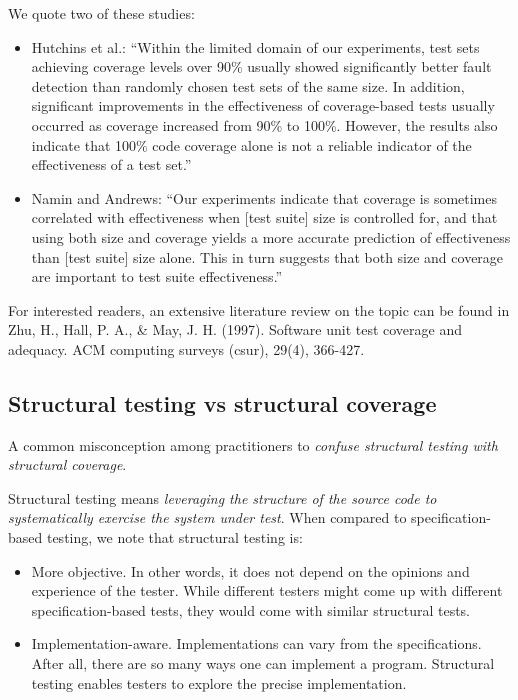We quote two of these studies:

\begin{itemize}
\tightlist
\item
  Hutchins et al.: ``Within the limited domain of our experiments, test
  sets achieving coverage levels over 90\% usually showed significantly
  better fault detection than randomly chosen test sets of the same
  size. In addition, significant improvements in the effectiveness of
  coverage-based tests usually occurred as coverage increased from 90\%
  to 100\%. However, the results also indicate that 100\% code coverage
  alone is not a reliable indicator of the effectiveness of a test
  set.''
\item
  Namin and Andrews: ``Our experiments indicate that coverage is
  sometimes correlated with effectiveness when {[}test suite{]} size is
  controlled for, and that using both size and coverage yields a more
  accurate prediction of effectiveness than {[}test suite{]} size alone.
  This in turn suggests that both size and coverage are important to
  test suite effectiveness.''
\end{itemize}

For interested readers, an extensive literature review on the topic can
be found in Zhu, H., Hall, P. A., \& May, J. H. (1997). Software unit
test coverage and adequacy. ACM computing surveys (csur), 29(4),
366-427.

\hypertarget{structural-testing-vs-structural-coverage}{%
\subsection{Structural testing vs structural
coverage}\label{structural-testing-vs-structural-coverage}}

A common misconception among practitioners to \emph{confuse structural
testing with structural coverage}.

Structural testing means \emph{leveraging the structure of the source
code to systematically exercise the system under test}. When compared to
specification-based testing, we note that structural testing is:

\begin{itemize}
\item
  More objective. In other words, it does not depend on the opinions and
  experience of the tester. While different testers might come up with
  different specification-based tests, they would come with similar
  structural tests.
\item
  Implementation-aware. Implementations can vary from the
  specifications. After all, there are so many ways one can implement a
  program. Structural testing enables testers to explore the precise
  implementation.
\end{itemize}

